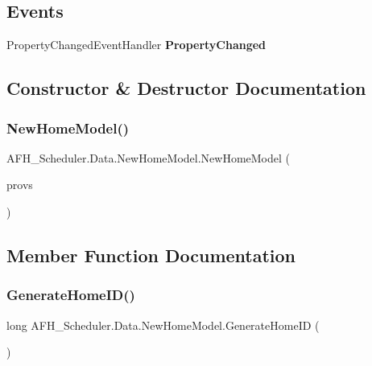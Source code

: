 \subsection*{Events}
\begin{DoxyCompactItemize}
\item 
Property\+Changed\+Event\+Handler \textbf{ Property\+Changed}
\end{DoxyCompactItemize}


\subsection{Constructor \& Destructor Documentation}
\mbox{\label{class_a_f_h___scheduler_1_1_data_1_1_new_home_model_ae003d209c891ae7eb437479e8a3960f3}} 
\subsubsection{NewHomeModel()}
{\footnotesize\ttfamily A\+F\+H\+\_\+\+Scheduler.\+Data.\+New\+Home\+Model.\+New\+Home\+Model (\begin{DoxyParamCaption}\item[{List$<$ \textbf{ Providers\+Model} $>$}]{provs }\end{DoxyParamCaption})}



\subsection{Member Function Documentation}
\mbox{\label{class_a_f_h___scheduler_1_1_data_1_1_new_home_model_a29f78d92e18a7f0e1b67d44c397e1484}} 
\subsubsection{GenerateHomeID()}
{\footnotesize\ttfamily long A\+F\+H\+\_\+\+Scheduler.\+Data.\+New\+Home\+Model.\+Generate\+Home\+ID (\begin{DoxyParamCaption}{ }\end{DoxyParamCaption})}

\mbox{\label{class_a_f_h___scheduler_1_1_data_1_1_new_home_model_a615f105c480c0818b969132492e2b7e6}} 
